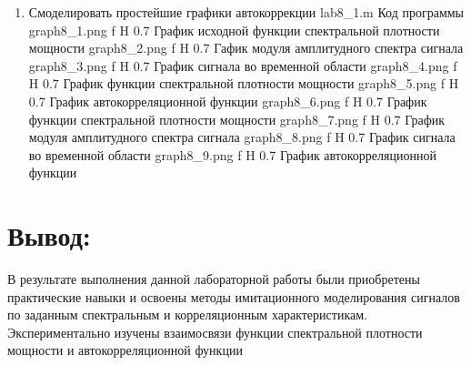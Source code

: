 \documentclass{bmstu}
\begin{document}
\begin{enumerate}

\item Смоделировать простейшие графики автокоррекции
        {lab8_1.m}
        {Код программы}
        {graph8_1.png}
        {f}
        {H}
        {0.7\textwidth}
        {График исходной функции спектральной плотности мощности}
        {graph8_2.png}
        {f}
        {H}
        {0.7\textwidth}
        {Гафик модуля амплитудного спектра сигнала}  
        {graph8_3.png}
        {f}
        {H}
        {0.7\textwidth}
        {График сигнала во временной области}
        {graph8_4.png}
        {f}
        {H}
        {0.7\textwidth}
        {График функции спектральной плотности мощности}
        {graph8_5.png}
        {f}
        {H}
        {0.7\textwidth}
        {График автокорреляционной функции}
        {graph8_6.png}
        {f}
        {H}
        {0.7\textwidth}
        {График функции спектральной плотности мощности}
        {graph8_7.png}
        {f}
        {H}
        {0.7\textwidth}
        {График модуля амплитудного спектра сигнала}
        {graph8_8.png}
        {f}
        {H}
        {0.7\textwidth}
        {График сигнала во временной области}
        {graph8_9.png}
        {f}
        {H}
        {0.7\textwidth}
        {График автокорреляционной функции}


\end{enumerate}

\chapter{Вывод:} 
В результате выполнения данной лабораторной работы были
приобретены практические навыки и освоены методы имитационного
моделирования сигналов по заданным спектральным и корреляционным
характеристикам. Экспериментально изучены взаимосвязи функции
спектральной плотности мощности и автокорреляционной функции
\end{document}
